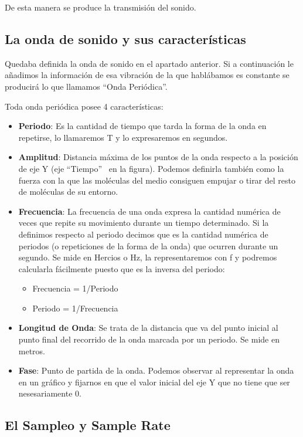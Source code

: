 De esta manera se produce la transmisión del sonido.

\subsection{La onda de sonido y sus características}\label{sec:Ondas} 

Quedaba definida la onda de sonido en el apartado anterior. Si a continuación le añadimos la información de esa vibración de la que hablábamos es constante se producirá lo que llamamos ``Onda Periódica''.

Toda onda periódica posee 4 características:

\begin{itemize}
	\item \textbf{Periodo}: Es la cantidad de tiempo que tarda la forma de la onda en repetirse, lo llamaremos T y lo expresaremos en segundos.
	 \item \textbf{Amplitud}: Distancia máxima de los puntos de la onda respecto a la posición de eje Y (eje ``Tiempo'' \ en la figura). Podemos definirla también como la fuerza con la que las moléculas del medio consiguen empujar o tirar del resto de moléculas de su entorno.
    \item \textbf{Frecuencia}: La frecuencia de una onda expresa la cantidad numérica de veces que repite su movimiento durante un tiempo determinado. Si la definimos respecto al periodo decimos que es la cantidad numérica de periodos (o repeticiones de la forma de la onda) que ocurren durante un segundo. Se mide en Hercios o Hz, la representaremos con f y podremos calcularla fácilmente puesto que es la inversa del periodo:
    \begin{itemize}
    \item Frecuencia = 1/Periodo
    \item Periodo = 1/Frecuencia   
    \end{itemize}
    \item \textbf{Longitud de Onda}: Se trata de la distancia que va del punto inicial al punto final del recorrido de la onda marcada por un periodo. Se mide en metros.
    \item \textbf{Fase}: Punto de partida de la onda. Podemos observar al representar la onda en un gráfico y fijarnos en que el valor inicial del eje Y que no tiene que ser nesesariamente 0.
\end{itemize} 

\subsection{El Sampleo y Sample Rate}\label{sec:sr} 

